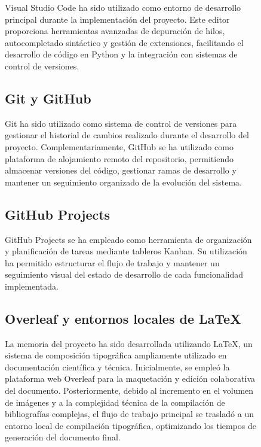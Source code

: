 \begin{figure}[H]
Visual Studio Code ha sido utilizado como entorno de desarrollo principal durante la implementación del proyecto. Este editor proporciona herramientas avanzadas de depuración de hilos, autocompletado sintáctico y gestión de extensiones, facilitando el desarrollo de código en Python y la integración con sistemas de control de versiones.

\subsection{Git y GitHub}

Git ha sido utilizado como sistema de control de versiones para gestionar el historial de cambios realizado durante el desarrollo del proyecto. Complementariamente, GitHub se ha utilizado como plataforma de alojamiento remoto del repositorio, permitiendo almacenar versiones del código, gestionar ramas de desarrollo y mantener un seguimiento organizado de la evolución del sistema.

\subsection{GitHub Projects}

GitHub Projects se ha empleado como herramienta de organización y planificación de tareas mediante tableros Kanban. Su utilización ha permitido estructurar el flujo de trabajo y mantener un seguimiento visual del estado de desarrollo de cada funcionalidad implementada.

\subsection{Overleaf y entornos locales de LaTeX}

La memoria del proyecto ha sido desarrollada utilizando \LaTeX{}, un sistema de composición tipográfica ampliamente utilizado en documentación científica y técnica. Inicialmente, se empleó la plataforma web Overleaf para la maquetación y edición colaborativa del documento. Posteriormente, debido al incremento en el volumen de imágenes y a la complejidad técnica de la compilación de bibliografías complejas, el flujo de trabajo principal se trasladó a un entorno local de compilación tipográfica, optimizando los tiempos de generación del documento final.


\end{figure}
